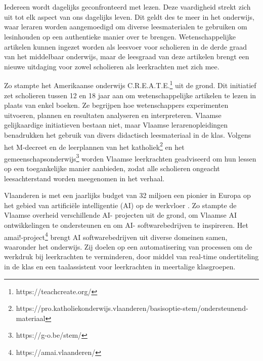 
\chapter{}%
\label{ch:inleiding}

Iedereen wordt dagelijks geconfronteerd met lezen. Deze vaardigheid strekt zich uit tot elk aspect van ons dagelijks leven. Dit geldt des te meer in het onderwijs, waar leraren worden aangemoedigd om diverse leesmaterialen te gebruiken om lesinhouden op een authentieke manier over te brengen. Wetenschappelijke artikelen kunnen ingezet worden als leesvoer voor scholieren in de derde graad van het middelbaar onderwijs, maar de leesgraad van deze artikelen brengt een nieuwe uitdaging voor zowel scholieren als leerkrachten met zich mee. 

\medspace

Zo stampte het Amerikaanse onderwijs C.R.E.A.T.E.\footnote{https://teachcreate.org/} uit de grond. Dit initiatief zet scholieren tussen 12 en 18 jaar aan om wetenschappelijke artikelen te lezen in plaats van enkel boeken. Ze begrijpen hoe wetenschappers experimenten uitvoeren, plannen en resultaten analyseren en interpreteren. Vlaamse gelijkaardige initiatieven bestaan niet, maar Vlaamse lerarenopleidingen benadrukken het gebruik van divers didactisch leesmateriaal in de klas. Volgens het M-decreet en de leerplannen van het katholiek\footnote{https://pro.katholiekonderwijs.vlaanderen/basisoptie-stem/ondersteunend-materiaal} en het gemeenschapsonderwijs\footnote{https://g-o.be/stem/} worden Vlaamse leerkrachten geadviseerd om hun lessen op een toegankelijke manier aanbieden, zodat alle scholieren ongeacht leesachterstand worden meegenomen in het verhaal. 

\medspace

Vlaanderen is met een jaarlijks budget van 32 miljoen een pionier in Europa op het gebied van artificiële intelligentie (AI) op de werkvloer \autocite{Crevits2022}. Zo stampte de Vlaamse overheid verschillende AI- projecten uit de grond, om Vlaamse AI ontwikkelingen te ondersteunen en om AI- softwarebedrijven te inspireren. Het amai!-project\footnote{https://amai.vlaanderen/} brengt AI softwarebedrijven uit diverse domeinen samen, waaronder het onderwijs. Zij doelen op een automatisering van processen om de werkdruk bij leerkrachten te verminderen, door middel van real-time ondertiteling in de klas en een taalassistent voor leerkrachten in meertalige klasgroepen.


